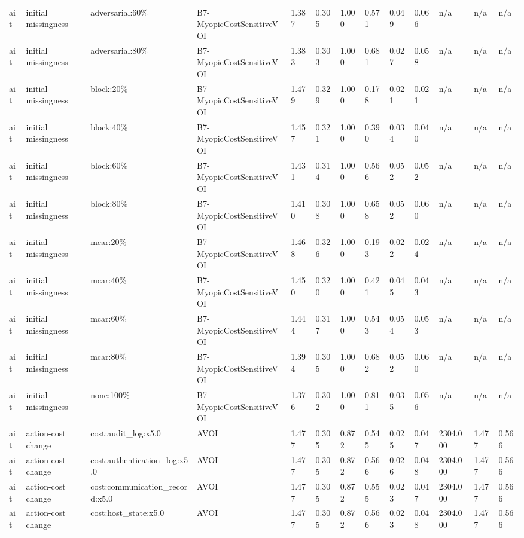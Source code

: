 \begin{table}[!ht]
{\begin{tabular}{lllllllllllll}
ait & initial missingness & adversarial:60\% & B7-MyopicCostSensitiveVOI & 1.387 & 0.305 & 1.000 & 0.571 & 0.049 & 0.066 & n/a & n/a & n/a \\
ait & initial missingness & adversarial:80\% & B7-MyopicCostSensitiveVOI & 1.383 & 0.303 & 1.000 & 0.681 & 0.027 & 0.058 & n/a & n/a & n/a \\
ait & initial missingness & block:20\% & B7-MyopicCostSensitiveVOI & 1.479 & 0.329 & 1.000 & 0.178 & 0.021 & 0.021 & n/a & n/a & n/a \\
ait & initial missingness & block:40\% & B7-MyopicCostSensitiveVOI & 1.457 & 0.321 & 1.000 & 0.390 & 0.034 & 0.040 & n/a & n/a & n/a \\
ait & initial missingness & block:60\% & B7-MyopicCostSensitiveVOI & 1.431 & 0.314 & 1.000 & 0.566 & 0.052 & 0.052 & n/a & n/a & n/a \\
ait & initial missingness & block:80\% & B7-MyopicCostSensitiveVOI & 1.410 & 0.308 & 1.000 & 0.658 & 0.052 & 0.060 & n/a & n/a & n/a \\
ait & initial missingness & mcar:20\% & B7-MyopicCostSensitiveVOI & 1.468 & 0.326 & 1.000 & 0.193 & 0.022 & 0.024 & n/a & n/a & n/a \\
ait & initial missingness & mcar:40\% & B7-MyopicCostSensitiveVOI & 1.450 & 0.320 & 1.000 & 0.421 & 0.045 & 0.043 & n/a & n/a & n/a \\
ait & initial missingness & mcar:60\% & B7-MyopicCostSensitiveVOI & 1.444 & 0.317 & 1.000 & 0.543 & 0.054 & 0.053 & n/a & n/a & n/a \\
ait & initial missingness & mcar:80\% & B7-MyopicCostSensitiveVOI & 1.394 & 0.305 & 1.000 & 0.682 & 0.052 & 0.060 & n/a & n/a & n/a \\
ait & initial missingness & none:100\% & B7-MyopicCostSensitiveVOI & 1.376 & 0.302 & 1.000 & 0.811 & 0.035 & 0.056 & n/a & n/a & n/a \\
ait & action-cost change & cost:audit\_log:x5.0 & AVOI & 1.477 & 0.305 & 0.872 & 0.545 & 0.025 & 0.047 & 2304.000 & 1.477 & 0.566 \\
ait & action-cost change & cost:authentication\_log:x5.0 & AVOI & 1.477 & 0.305 & 0.872 & 0.566 & 0.026 & 0.048 & 2304.000 & 1.477 & 0.566 \\
ait & action-cost change & cost:communication\_record:x5.0 & AVOI & 1.477 & 0.305 & 0.872 & 0.555 & 0.023 & 0.047 & 2304.000 & 1.477 & 0.566 \\
ait & action-cost change & cost:host\_state:x5.0 & AVOI & 1.477 & 0.305 & 0.872 & 0.566 & 0.023 & 0.048 & 2304.000 & 1.477 & 0.566 \\

\end{tabular}}
\end{table}
